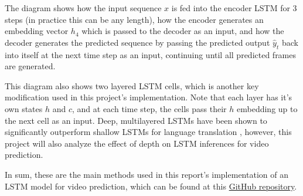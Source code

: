 \documentclass{scrartcl}
\begin{document}
The diagram shows how the input sequence $x$ is fed into the encoder LSTM for 3
steps (in practice this can be any length), how the encoder generates an
embedding vector $h_4$ which is passed to the decoder as an input, and how the
decoder generates the predicted sequence by passing the predicted output
$\hat{y}_{t}$ back into itself at the next time step as an input, continuing until
all predicted frames are generated.

This diagram also shows two layered LSTM cells, which is another key
modification used in this project's implementation. Note that each layer has
it's own states $h$ and $c$, and at each time step, the cells pass their $h$
embedding up to the next cell as an input. Deep, multilayered LSTMs have been
shown to significantly outperform shallow LSTMs for language translation
\cite{seq2seq_original}, however, this project will also analyze the effect of
depth on LSTM inferences for video prediction. 

In sum, these are the main methods used in this report's implementation of an
LSTM model for video prediction, which can be found at this
\href{https://github.com/msc5/junior-iw}{GitHub repository}.

%
%
%
\end{document}
